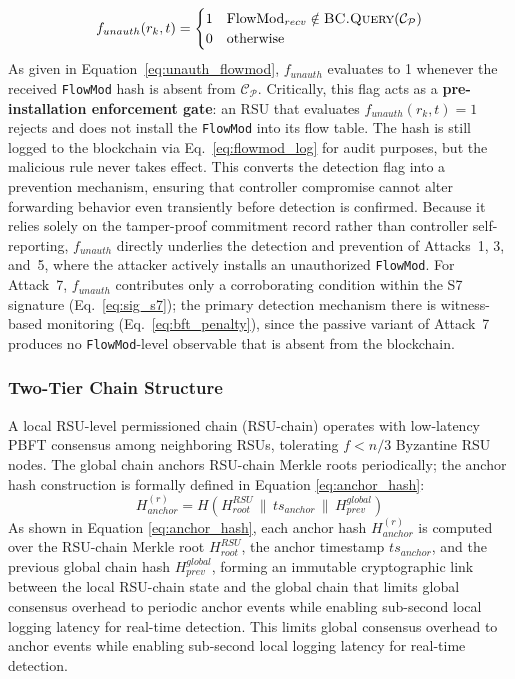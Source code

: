 \documentclass[12pt, a4paper]{report}
\begin{document}
{\begin{equation}
f_{unauth}(r_k, t) =
\begin{cases}
1 & \text{FlowMod}_{recv} \notin
    \textsc{BC.Query}(\mathcal{C}_{\mathcal{P}}) \\
0 & \text{otherwise}
\end{cases}
\label{eq:unauth_flowmod}
\end{equation}
As given in Equation~\eqref{eq:unauth_flowmod},
$f_{unauth}$ evaluates to 1 whenever the received
\texttt{FlowMod} hash is absent from
$\mathcal{C}_{\mathcal{P}}$. Critically, this flag acts
as a \textbf{pre-installation enforcement gate}: an
\ac{RSU} that evaluates $f_{unauth}(r_k,t){=}1$ rejects
and does not install the \texttt{FlowMod} into its flow
table. The hash is still logged to the blockchain via
Eq.~\eqref{eq:flowmod_log} for audit purposes, but the
malicious rule never takes effect. This converts the
detection flag into a prevention mechanism, ensuring
that controller compromise cannot alter forwarding
behavior even transiently before detection is confirmed.
Because it relies solely on the tamper-proof commitment
record rather than controller self-reporting,
$f_{unauth}$ directly underlies the detection and
prevention of Attacks~1, 3, and~5, where the attacker
actively installs an unauthorized \texttt{FlowMod}. For
Attack~7, $f_{unauth}$ contributes only a corroborating
condition within the S7 signature
(Eq.~\ref{eq:sig_s7}); the primary detection mechanism
there is witness-based monitoring
(Eq.~\ref{eq:bft_penalty}), since the passive variant of
Attack~7 produces no \texttt{FlowMod}-level observable
that is absent from the blockchain.

\subsubsection{Two-Tier Chain Structure}
A local RSU-level permissioned chain (RSU-chain) operates with
low-latency PBFT consensus among neighboring RSUs, tolerating
$f < n/3$ Byzantine RSU nodes. The global chain anchors RSU-chain
Merkle roots periodically;
the anchor hash construction is formally defined in
Equation \eqref{eq:anchor_hash}:
\begin{equation}
H_{anchor}^{(r)} = H\!\left(H_{root}^{RSU} \,\|\,
ts_{anchor} \,\|\, H_{prev}^{global}\right)
\label{eq:anchor_hash}
\end{equation}
As shown in Equation \eqref{eq:anchor_hash}{, each anchor hash
$H_{anchor}^{(r)}$ is computed over the RSU-chain Merkle root
$H_{root}^{RSU}$, the anchor timestamp $ts_{anchor}$, and the
previous global chain hash $H_{prev}^{global}$, forming an
immutable cryptographic link between the local RSU-chain state and
the global chain that limits global consensus overhead to periodic
anchor events while enabling sub-second local logging latency for
real-time detection.}
This limits global consensus overhead to anchor events while
enabling sub-second local logging latency for real-time detection.

}
\end{document}
